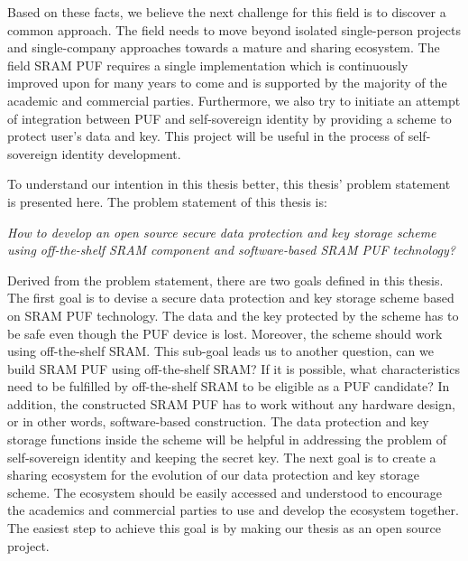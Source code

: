 Based on these facts, we believe the next challenge for this field is to discover a common approach. The field needs to move beyond isolated single-person projects and single-company approaches towards a mature and sharing ecosystem. The field SRAM PUF requires a single implementation which is continuously improved upon for many years to come and is supported by the majority of the academic and commercial parties.
Furthermore, we also try to initiate an attempt of integration between PUF and self-sovereign identity by providing a scheme to protect user's data and key. This project will be useful in the process of self-sovereign identity development.

To understand our intention in this thesis better, this thesis' problem statement is presented here. The problem statement of this thesis is:

\begin{adjustwidth}{1cm}{1cm}
		\textit{How to develop an open source secure data protection and key storage scheme using off-the-shelf SRAM component and software-based SRAM PUF technology?}
\end{adjustwidth}

Derived from the problem statement, there are two goals defined in this thesis. The first goal is to devise a secure data protection and key storage scheme based on SRAM PUF technology. The data and the key protected by the scheme has to be safe even though the PUF device is lost. Moreover, the scheme should work using off-the-shelf SRAM. This sub-goal leads us to another question, can we build SRAM PUF using off-the-shelf SRAM? If it is possible, what characteristics need to be fulfilled by off-the-shelf SRAM to be eligible as a PUF candidate?
In addition, the constructed SRAM PUF has to work without any hardware design, or in other words, software-based construction. The data protection and key storage functions inside the scheme will be helpful in addressing the problem of self-sovereign identity and keeping the secret key.
The next goal is to create a sharing ecosystem for the evolution of our data protection and key storage scheme. The ecosystem should be easily accessed and understood to encourage the academics and commercial parties to use and develop the ecosystem together. The easiest step to achieve this goal is by making our thesis as an open source project.

